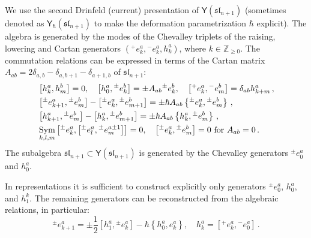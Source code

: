 \documentclass[10pt]{article}
\theoremstyle{definition}
\def\IZ{{\mathbb{Z}}}
\def\fl{\mathfrak{l}}
\def\fs{\mathfrak{s}}
\def\fs{\mathfrak{s}}
\def\myY{{\mathsf{Y}}}
\def\lm{\limits}
\numberwithin{equation}{section}
\begin{document}
We use the second Drinfeld (current) presentation of $\myY(\fs\fl_{n+1})$ \cite{Drinfeld2} (sometimes denoted as $\myY_{\hbar}(\fs\fl_{n+1})$ to make the deformation parametrization $\hbar$ explicit).
The algebra is generated by the modes of the Chevalley triplets of the raising, lowering and Cartan  generators $({}^{+}e_k^a,{}^{-}e_k^a,h_k^a)$, where $k\in \IZ_{\geq 0}$.
The commutation relations can be expressed in terms of the Cartan matrix $A_{ab}=2\delta_{a,b}-\delta_{a,b+1}-\delta_{a+1,b}$ of $\fs\fl_{n+1}$:
\begin{equation}\label{Yangian}
	\begin{aligned}
		& \left[h_k^a,h_m^b\right]=0,\quad \left[h_0^a,{}^{\pm}e_k^b\right]=\pm A_{ab}{}^{\pm}e_k^b,\quad \left[{}^+e_k^a,{}^-e_m^b\right]=\delta_{ab}h_{k+m}^a\,,\\
		& \left[{}^{\pm}e_{k+1}^a,{}^{\pm}e_{m}^b\right]-\left[{}^{\pm}e_{k}^a,{}^{\pm}e_{m+1}^b\right]=\pm\hbar A_{ab}\left\{{}^{\pm}e_{k}^a,{}^{\pm}e_{m}^b\right\}\,,\\
		& \left[h_{k+1}^a,{}^{\pm}e_{m}^b\right]-\left[h_{k}^a,{}^{\pm}e_{m+1}^b\right]=\pm\hbar A_{ab}\left\{h_k^a,{}^{\pm}e_{m}^b\right\}\,,\\
		& \mathop{\rm Sym}\lm_{k,l,m}\left[{}^{\pm}e_k^{a},\left[{}^{\pm}e_l^{a},{}^{\pm}e_m^{a\pm 1}\right]\right]=0,\quad \left[{}^{\pm}e_{k}^a,{}^{\pm}e_{m}^b\right]=0\mbox{ for }A_{ab}=0\,.
	\end{aligned}
\end{equation}
The subalgebra $\fs\fl_{n+1}\subset \myY(\fs\fl_{n+1})$ is generated by the Chevalley generators ${}^{\pm}e_0^a$ and $h_0^a$.

In representations it is sufficient to construct explicitly only generators ${}^{\pm}e^a_0$, $h_0^a$, and $h_1^k$.
The remaining generators can be reconstructed from the algebraic relations, in particular:
\begin{equation}\label{mode-shift}
	{}^{\pm}e_{k+1}^a=\pm\frac{1}{2}\left[h_1^a,{}^{\pm}e_k^a\right]-\hbar\left\{h_0^a,e_k^a\right\},\quad h_k^a=\left[{}^+e_k^a,{}^-e_0^a\right]\,.
\end{equation}
\end{document}
